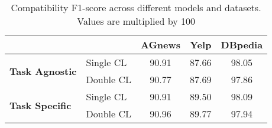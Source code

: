 \begin{table*}[h]
    \centering
    \begin{tabular}{|l|l|c|c|c|}
        \hline
        \multicolumn{2}{|c|}{} & \textbf{AGnews} & \textbf{Yelp} & \textbf{DBpedia} \\
        \hline
        \multirow{2}{*}{\textbf{Task Agnostic}} & Single CL & 90.91 & 87.66 & 98.05 \\
        & Double CL & 90.77 & 87.69 & 97.86 \\
        \hline
        \multirow{2}{*}{\textbf{Task Specific}} & Single CL & 90.91 & 89.50 & 98.09 \\
        & Double CL & 90.96 & 89.77 & 97.94 \\
        \hline
    \end{tabular}
    \caption{Compatibility F1-score across different models and datasets. Values are multiplied by 100}
    \label{tab:compatibility_f1_results}
\end{table*}